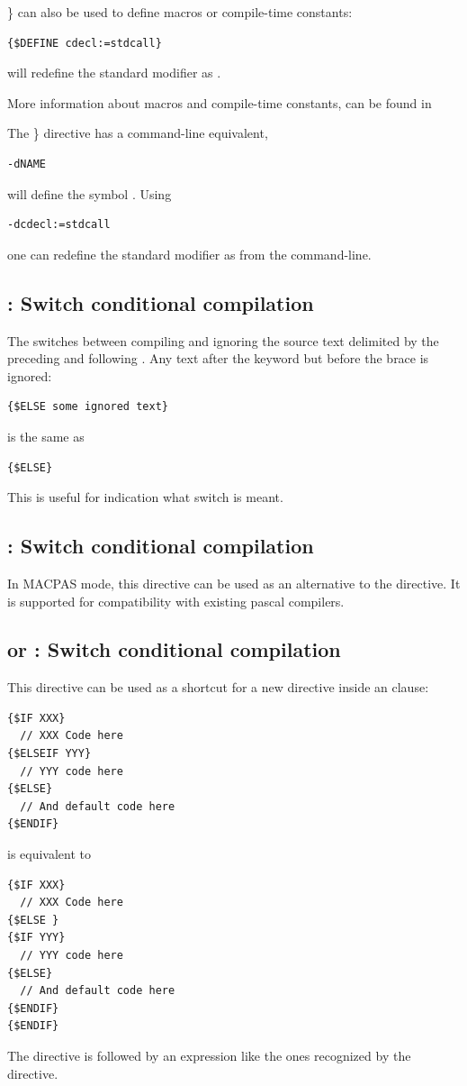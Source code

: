 \} can also be used to define macros or compile-time constants:
\begin{verbatim}
{$DEFINE cdecl:=stdcall}
\end{verbatim}
will redefine the standard modifier  as .

More information about macros and compile-time constants, can be found in

The \} directive has a command-line equivalent, 
\begin{verbatim}
-dNAME
\end{verbatim}
will define the symbol . Using
\begin{verbatim}
-dcdecl:=stdcall
\end{verbatim}
one can redefine the standard modifier  as 
from the command-line.

\subsection{ : Switch conditional compilation}

The  switches between compiling and ignoring the source
text delimited by the preceding  and following
. Any text after the  keyword but before the
brace is ignored:
\begin{verbatim}
{$ELSE some ignored text}
\end{verbatim}
is the same as
\begin{verbatim}
{$ELSE}
\end{verbatim}
This is useful for indication what switch is meant.

\subsection{ : Switch conditional compilation}
In MACPAS mode, this directive can be used as an alternative to the 
directive. It is supported for compatibility with existing \macos pascal
compilers.

\subsection{ or  : Switch conditional compilation}
This directive can be used as a shortcut for a new
 directive inside an  clause:
\begin{verbatim}
{$IF XXX}
  // XXX Code here
{$ELSEIF YYY}
  // YYY code here
{$ELSE}
  // And default code here
{$ENDIF}
\end{verbatim}
is equivalent to
\begin{verbatim}
{$IF XXX}
  // XXX Code here
{$ELSE }
{$IF YYY}
  // YYY code here
{$ELSE}
  // And default code here
{$ENDIF}
{$ENDIF}
\end{verbatim}
The directive is followed by an expression like the ones recognized by the 
 directive.

